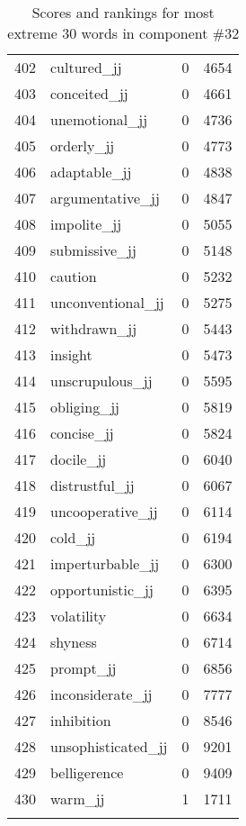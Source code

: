 \begin{longtable}[!htbp]{| rlr@{.}l |}
    402 & cultured\_jj & 0 & 4654 \\
    403 & conceited\_jj & 0 & 4661 \\
    404 & unemotional\_jj & 0 & 4736 \\
    405 & orderly\_jj & 0 & 4773 \\
    406 & adaptable\_jj & 0 & 4838 \\
    407 & argumentative\_jj & 0 & 4847 \\
    408 & impolite\_jj & 0 & 5055 \\
    409 & submissive\_jj & 0 & 5148 \\
    410 & caution & 0 & 5232 \\
    411 & unconventional\_jj & 0 & 5275 \\
    412 & withdrawn\_jj & 0 & 5443 \\
    413 & insight & 0 & 5473 \\
    414 & unscrupulous\_jj & 0 & 5595 \\
    415 & obliging\_jj & 0 & 5819 \\
    416 & concise\_jj & 0 & 5824 \\
    417 & docile\_jj & 0 & 6040 \\
    418 & distrustful\_jj & 0 & 6067 \\
    419 & uncooperative\_jj & 0 & 6114 \\
    420 & cold\_jj & 0 & 6194 \\
    421 & imperturbable\_jj & 0 & 6300 \\
    422 & opportunistic\_jj & 0 & 6395 \\
    423 & volatility & 0 & 6634 \\
    424 & shyness & 0 & 6714 \\
    425 & prompt\_jj & 0 & 6856 \\
    426 & inconsiderate\_jj & 0 & 7777 \\
    427 & inhibition & 0 & 8546 \\
    428 & unsophisticated\_jj & 0 & 9201 \\
    429 & belligerence & 0 & 9409 \\
    430 & warm\_jj & 1 & 1711 \\
    \hline
    \caption{Scores and rankings for most extreme 30 words in component \#32} \\
\end{longtable}
